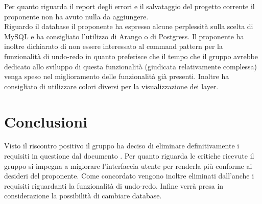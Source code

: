 \documentclass[../AnalisiDeiRequisiti.tex]{subfiles}
\begin{document}
		Per quanto riguarda il report degli errori e il salvataggio del progetto corrente il proponente non ha avuto nulla da aggiungere. \\
		Riguardo il database il proponente ha espresso alcune perplessità sulla scelta di MySQL e ha consigliato l'utilizzo di Arango o di Postgress. 
		Il proponente ha inoltre dichiarato di non essere interessato al command pattern per la funzionalità di undo-redo in quanto preferisce che il tempo che il gruppo avrebbe dedicato allo sviluppo di questa funzionalità (giudicata relativamente complessa) venga speso nel miglioramento delle funzionalità già presenti.
		Inoltre ha consigliato di utilizzare colori diversi per la visualizzazione dei layer.\\
	
	
	\section*{Conclusioni}
	
		Visto il riscontro positivo il gruppo ha deciso di eliminare definitivamente i requisiti in questione dal documento \analisideirequisiti.
		Per quanto riguarda le critiche ricevute il gruppo si impegna a miglorare l'interfaccia utente per renderla più conforme ai desideri del proponente.
		Come concordato vengono inoltre eliminati dall'\analisideirequisiti anche i requisiti riguardanti la funzionalità di undo-redo. 
		Infine verrà presa in considerazione la possibilità di cambiare database.
\end{document}
